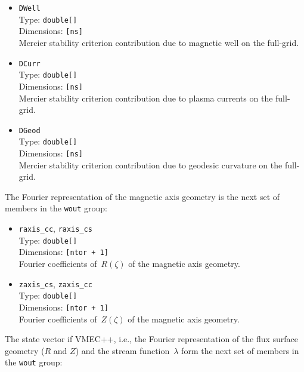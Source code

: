 \begin{itemize}
       Dimensions: \texttt{[ns]} \\
       Mercier stability criterion contribution due to magnetic shear on the full-grid.
 \item \texttt{DWell} \\
       Type: \texttt{double[]} \\
       Dimensions: \texttt{[ns]} \\
       Mercier stability criterion contribution due to magnetic well on the full-grid.
 \item \texttt{DCurr} \\
       Type: \texttt{double[]} \\
       Dimensions: \texttt{[ns]} \\
       Mercier stability criterion contribution due to plasma currents on the full-grid.
 \item \texttt{DGeod} \\
       Type: \texttt{double[]} \\
       Dimensions: \texttt{[ns]} \\
       Mercier stability criterion contribution due to geodesic curvature on the full-grid.
\end{itemize}
%
The Fourier representation of the magnetic axis geometry
is the next set of members in the \texttt{wout} group:
\begin{itemize}
 \item \texttt{raxis\_cc}, \texttt{raxis\_cs} \\
       Type: \texttt{double[]} \\
       Dimensions: \texttt{[ntor + 1]} \\
       Fourier coefficients of~$R(\zeta)$ of the magnetic axis geometry.
 \item \texttt{zaxis\_cs}, \texttt{zaxis\_cc} \\
       Type: \texttt{double[]} \\
       Dimensions: \texttt{[ntor + 1]} \\
       Fourier coefficients of~$Z(\zeta)$ of the magnetic axis geometry.
\end{itemize}
%
The state vector if VMEC++, i.e., the Fourier representation of the flux surface geometry ($R$ and $Z$)
and the stream function~$\lambda$
form the next set of members in the \texttt{wout} group:
